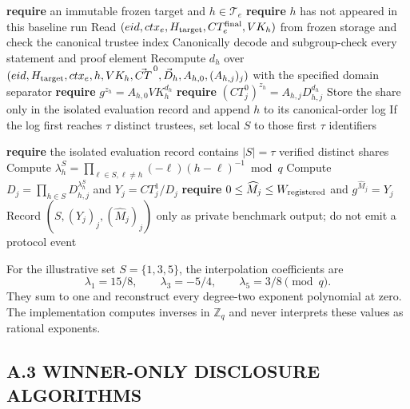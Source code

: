 \documentclass[pdflatex,sn-mathphys-num]{sn-jnl}%
\theoremstyle{thmstyleone}%
\theoremstyle{thmstyletwo}%
\theoremstyle{thmstylethree}%
\begin{document}
\begin{appendices}
\begin{algorithm}[H]
\caption{$\mathsf{BaselineVerifyThresholdShare}(eid,h,\vec D_h,\pi_h^{\rm dec})$ (evaluation only)}
\label{alg:submit-threshold-share}
\begin{algorithmic}[1]
\State \textbf{require} an immutable frozen target and $h\in\mathcal T_e$
\State \textbf{require} $h$ has not appeared in this baseline run
\State Read $(eid,ctx_e,H_{\rm target},CT_e^{\rm final},VK_h)$ from frozen storage and check the canonical trustee index
\State Canonically decode and subgroup-check every statement and proof element
\State Recompute $d_h$ over $(eid,H_{\rm target},ctx_e,h,VK_h,\vec{CT}^{\,0},\vec D_h,A_{h,0},(A_{h,j})_j)$ with the specified domain separator
\State \textbf{require} $g^{z_h}=A_{h,0}VK_h^{d_h}$
  \State \textbf{require} $(CT_j^0)^{z_h}=A_{h,j}D_{h,j}^{d_h}$
\EndFor
\State Store the share only in the isolated evaluation record and append $h$ to its canonical-order log
\State If the log first reaches $\tau$ distinct trustees, set local $S$ to those first $\tau$ identifiers
\end{algorithmic}
\end{algorithm}

\begin{algorithm}[H]
\caption{$\mathsf{EvaluateFullTallyBaseline}(eid,(\widehat M_j)_j)$ (evaluation only)}
\label{alg:finalize-threshold-tally}
\begin{algorithmic}[1]
\State \textbf{require} the isolated evaluation record contains $|S|=\tau$ verified distinct shares
  \State Compute $\lambda_h^S=\prod_{\ell\in S,\ell\neq h}(-\ell)(h-\ell)^{-1}\bmod q$
\EndFor
{}
  \State Compute $D_j=\prod_{h\in S}D_{h,j}^{\lambda_h^S}$ and $Y_j=CT_j^1/D_j$
  \State \textbf{require} $0\leq\widehat M_j\leq W_{\rm registered}$ and $g^{\widehat M_j}=Y_j$
\EndFor
\State Record $(S,(Y_j)_j,(\widehat M_j)_j)$ only as private benchmark output; do not emit a protocol event
\end{algorithmic}
\end{algorithm}

For the illustrative set $S=\{1,3,5\}$, the interpolation coefficients are
\[
 \lambda_1=15/8,\qquad \lambda_3=-5/4,
 \qquad \lambda_5=3/8\pmod q.
\]
They sum to one and reconstruct every degree-two exponent polynomial at zero.
The implementation computes inverses in $\mathbb Z_q$ and never interprets
these values as rational exponents.

\subsection*{A.3 WINNER-ONLY DISCLOSURE ALGORITHMS}


\end{appendices}
\end{document}
